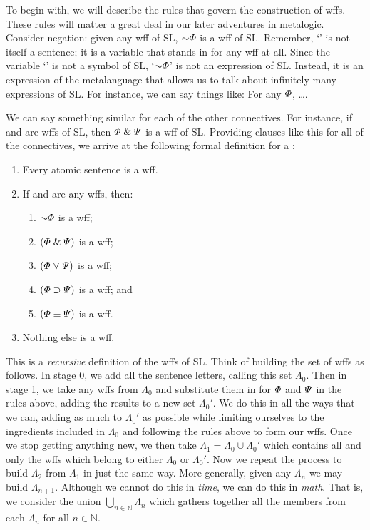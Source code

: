 To begin with, we will describe the rules that govern the construction of wffs.
These rules will matter a great deal in our later adventures in metalogic.
Consider negation: given any wff \metaA{} of SL, $\enot\metaA{}$ is a wff of SL.
Remember, `\metaA{}' is not itself a sentence; it is a variable that stands in for any wff at all.
Since the variable `\metaA{}' is not a symbol of SL, `$\enot\metaA{}$' is not an expression of SL.
Instead, it is an expression of the metalanguage that allows us to talk about infinitely many expressions of SL.
For instance, we can say things like: For any $\varPhi$, \ldots.

We can say something similar for each of the other connectives.
For instance, if \metaA{} and \metaB{} are wffs of SL, then $\varPhi{}\mathrel\&\varPsi{}$ is a wff of SL.
Providing clauses like this for all of the connectives, we arrive at the following formal definition for a :

\begin{enumerate}
\item Every atomic sentence is a wff.
\item If \metaA{} and \metaB{} are any wffs, then:
	\begin{enumerate}
		\item $\enot\metaA{}$ is a wff;
		\item $(\varPhi{}\mathrel\&\varPsi{})$ is a wff;
		\item $(\varPhi{}\mkern1mu\vee\mkern1mu\varPsi{})$ is a wff;
		\item $(\varPhi{}\supset\varPsi{})$ is a wff; and
		\item $(\varPhi{}\equiv\varPsi{})$ is a wff.
	\end{enumerate}
\item Nothing else is a wff.
\end{enumerate}

This is a \emph{recursive} definition of the wffs of SL.
Think of building the set of wffs as follows.
In stage 0, we add all the sentence letters, calling this set $\Lambda_0$.
Then in stage 1, we take any wffs from $\Lambda_0$ and substitute them in for $\varPhi{}$ and $\varPsi{}$ in the rules above, adding the results to a new set $\Lambda_0'$.
We do this in all the ways that we can, adding as much to $\Lambda_0'$ as possible while limiting ourselves to the ingredients included in $\Lambda_0$ and following the rules above to form our wffs. 
Once we stop getting anything new, we then take $\Lambda_1 = \Lambda_0 \cup \Lambda_0'$ which contains all and only the wffs which belong to either $\Lambda_0$ or $\Lambda_0'$.
Now we repeat the process to build $\Lambda_2$ from $\Lambda_1$ in just the same way.
More generally, given any $\Lambda_n$ we may build $\Lambda_{n+1}$.
Although we cannot do this in \textit{time}, we can do this in \textit{math}.
That is, we consider the union $\bigcup_{n\in \mathbb{N}}\Lambda_n$ which gathers together all the members from each $\Lambda_n$ for all $n \in \mathbb{N}$.

